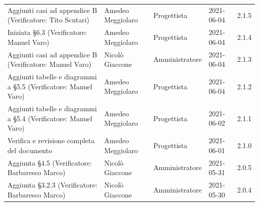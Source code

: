 \documentclass[a4paper]{article}
\begin{document}
\begin{center}
\begin{table}[h!]
\begin{tabular}{p{160px} p{90px} p{70px} p{55px} p{45px}}
            Aggiunti casi ad appendice B \newline(Verificatore: Tito Scutari)         & Amedeo Meggiolaro & Progettista    & 2021-06-04    & 2.1.5             \\
            Iniziata \S 6.3 \newline(Verificatore: Manuel Varo)                       & Amedeo Meggiolaro & Progettista    & 2021-06-04    & 2.1.4             \\
            Aggiunti casi ad appendice B \newline(Verificatore: Manuel Varo)          & Nicolò Giaccone   & Amministratore & 2021-06-04    & 2.1.3             \\
            Aggiunti tabelle e diagrammi a \S 5.5 \newline(Verificatore: Manuel Varo) & Amedeo Meggiolaro & Progettista    & 2021-06-04    & 2.1.2             \\
            Aggiunti tabelle e diagrammi a \S 5.4 \newline(Verificatore: Manuel Varo) & Amedeo Meggiolaro & Progettista    & 2021-06-02    & 2.1.1             \\
            Verifica e revisione completa del documento                               & Amedeo Meggiolaro & Progettista    & 2021-06-01    & 2.1.0             \\
            Aggiunta \S 4.5 \newline(Verificatore: Barbaresco Marco)                  & Nicolò Giaccone   & Amministratore & 2021-05-31    & 2.0.5             \\
            Aggiunta \S 3.2.3 \newline(Verificatore: Barbaresco Marco)                & Nicolò Giaccone   & Amministratore & 2021-05-30    & 2.0.4             \\
        \end{tabular}
    \end{table}
    

\end{center}
\end{document}
